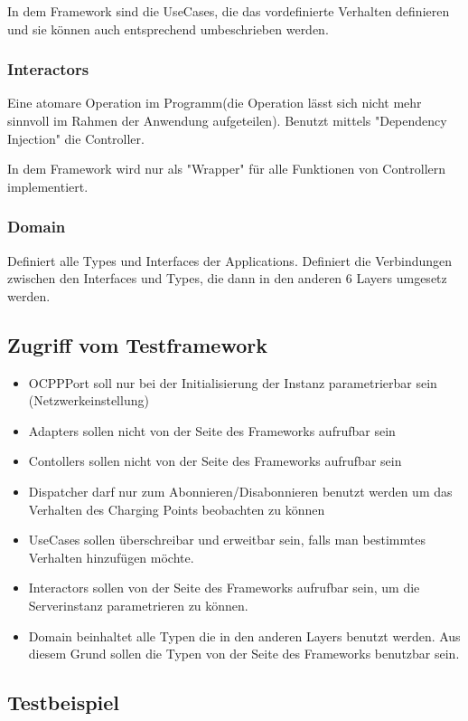         In dem Framework sind die UseCases, die das vordefinierte Verhalten definieren und sie können auch entsprechend umbeschrieben werden.
        \subsubsection{Interactors}
        Eine atomare Operation im Programm(die Operation lässt sich nicht mehr sinnvoll im Rahmen der Anwendung aufgeteilen).
        Benutzt mittels "Dependency Injection" die Controller.

        In dem Framework wird nur als "Wrapper" für alle Funktionen von Controllern implementiert.
        \subsubsection{Domain}
        Definiert alle Types und Interfaces der Applications.
        Definiert die Verbindungen zwischen den Interfaces und Types, die dann in den anderen 6 Layers umgesetz werden.

    \subsection{Zugriff vom Testframework}
    \begin{itemize}
        \item OCPPPort soll nur bei der Initialisierung der Instanz parametrierbar sein (Netzwerkeinstellung)
        \item Adapters sollen nicht von der Seite des Frameworks aufrufbar sein
        \item Contollers sollen nicht von der Seite des Frameworks aufrufbar sein
        \item Dispatcher darf nur zum Abonnieren/Disabonnieren benutzt werden um das Verhalten des Charging Points beobachten zu können
        \item UseCases sollen überschreibar und erweitbar sein, falls man bestimmtes Verhalten hinzufügen möchte.
        \item Interactors sollen von der Seite des Frameworks aufrufbar sein, um die Serverinstanz parametrieren zu können.
        \item Domain beinhaltet alle Typen die in den anderen Layers benutzt werden. Aus diesem Grund sollen die Typen von der Seite des Frameworks benutzbar sein.
    \end{itemize}

    \subsection{Testbeispiel}
